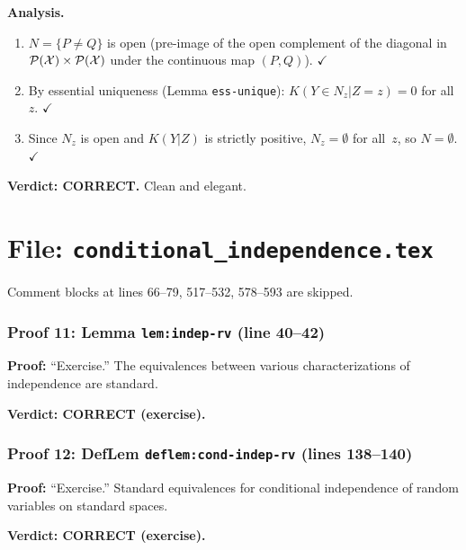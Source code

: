 \documentclass{article}
\begin{document}
\textbf{Analysis.}
\begin{enumerate}[leftmargin=*]
  \item $N=\{P\neq Q\}$ is open (pre-image of the open complement of the diagonal
    in $\mathcal{P}(\mathcal{X})\times\mathcal{P}(\mathcal{X})$ under the continuous map $(P,Q)$).  $\checkmark$
  \item By essential uniqueness (Lemma \texttt{ess-unique}): $K(Y\in N_z|Z=z)=0$
    for all~$z$.  $\checkmark$
  \item Since $N_z$ is open and $K(Y|Z)$ is strictly positive, $N_z=\emptyset$
    for all~$z$, so $N=\emptyset$.  $\checkmark$
\end{enumerate}

\textbf{Verdict: CORRECT.}  Clean and elegant.

\part*{File: \texttt{conditional\_independence.tex}}

Comment blocks at lines 66--79, 517--532, 578--593 are skipped.

\section{Proof 11: Lemma \texttt{lem:indep-rv} (line 40--42)}
\textbf{Proof:} ``Exercise.''  The equivalences between various characterizations
of independence are standard.

\textbf{Verdict: CORRECT (exercise).}

\section{Proof 12: DefLem \texttt{deflem:cond-indep-rv} (lines 138--140)}
\textbf{Proof:} ``Exercise.''  Standard equivalences for conditional independence
of random variables on standard spaces.

\textbf{Verdict: CORRECT (exercise).}

\end{document}
